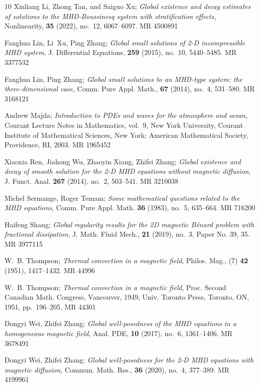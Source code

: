 \documentclass[reqno]{amsart}
\begin{document}
\begin{thebibliography}{10}
Xinliang Li, Zhong Tan, and Saiguo Xu; 
\emph{Global existence and decay  estimates of solutions to the 
{MHD}-{B}oussinesq system with stratification
 effects}, Nonlinearity, \textbf{35} (2022), no.~12, 6067--6097. MR {4500891}

Fanghua Lin, Li~Xu, Ping Zhang; 
\emph{Global small solutions of 2-{D}
 incompressible {MHD} system}, J. Differential Equations, \textbf{259} (2015),
 no.~10, 5440--5485. MR {3377532}

Fanghua Lin, Ping Zhang; 
\emph{Global small solutions to an {MHD}-type
 system: the three-dimensional case}, Comm. Pure Appl. Math., \textbf{67}
 (2014), no.~4, 531--580. MR {3168121}

Andrew Majda; 
\emph{Introduction to {PDE}s and waves for the atmosphere and ocean}, 
Courant Lecture Notes in Mathematics, vol.~9, New York University,
Courant Institute of Mathematical Sciences, New York; American Mathematical
Society, Providence, RI, 2003. MR {1965452}

Xiaoxia Ren, Jiahong Wu, Zhaoyin Xiang, Zhifei Zhang; 
\emph{Global  existence and decay of smooth solution for the 2-{D} {MHD} equations
 without  magnetic diffusion}, J. Funct. Anal. \textbf{267} (2014), no.~2, 503--541.
 MR {3210038}

Michel Sermange, Roger Temam; 
\emph{Some mathematical questions related to
 the {MHD} equations}, Comm. Pure Appl. Math. \textbf{36} (1983), no.~5,
 635--664. MR {716200}

Haifeng Shang; 
\emph{Global regularity results for the 2{D} magnetic
 {B}\'enard problem with fractional dissipation}, J. Math. Fluid Mech.,
 \textbf{21} (2019), no.~3, Paper No. 39, 35. MR {3977115}

W.~B. Thompson; 
\emph{Thermal convection in a magnetic field}, Philos. Mag., (7)
 \textbf{42} (1951), 1417--1432. MR {44996}

W.~B. Thompson; 
\emph{Thermal convection in a magnetic field}, Proc. {S}econd
 {C}anadian {M}ath. {C}ongress, {V}ancouver, 1949, Univ. Toronto Press,
 Toronto, ON, 1951, pp.~196--205. MR {44301}

Dongyi Wei, Zhifei Zhang; 
\emph{Global well-posedness of the {MHD} equations
 in a homogeneous magnetic field}, Anal. PDE, \textbf{10} (2017), no.~6,
 1361--1406. MR {3678491}

Dongyi Wei, Zhifei Zhang; 
\emph{Global well-posedness for the 2-{D} {MHD} equations with
 magnetic diffusion}, Commun. Math. Res., \textbf{36} (2020), no.~4, 377--389.
 MR {4199961}


\end{thebibliography}
\end{document}
